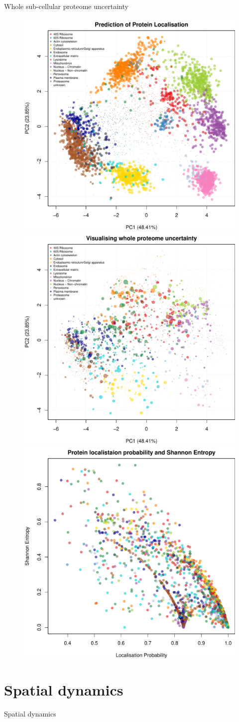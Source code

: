\documentclass{beamer}
\theoremstyle{example}
\begin{document}
\begin{frame}{Whole sub-cellular proteome uncertainty}
  \begin{figure}
    \centering
    \includegraphics[width=.32\linewidth]{./figs/pca-tagm-mcmc-1.pdf}
    \includegraphics[width=.32\linewidth]{./figs/pca-tagm-map-1.pdf}
    \includegraphics[width=.32\linewidth]{./figs/prob-vs-shannon-1.pdf}
  \end{figure}
\end{frame}



\section{Spatial dynamics}


\begin{frame}{Spatial dynamics}

\end{frame}


\end{document}
